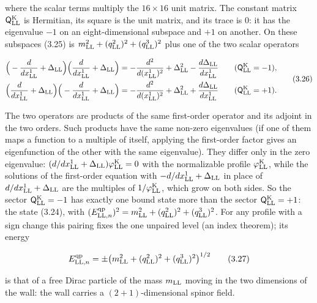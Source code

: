 \documentclass[
  10pt,
]{article}
\begin{document}
where the scalar terms multiply the \(16\times16\) unit matrix. The
constant matrix \(\mathsf Q^{\rm K}_{\rm LL}\) is Hermitian, its square
is the unit matrix, and its trace is 0: it has the eigenvalue \(-1\) on
an eight-dimensional subspace and \(+1\) on another. On these subspaces
(3.25) is \(m_{\rm LL}^2+(q^2_{\rm LL})^2+(q^3_{\rm LL})^2\) plus one of
the two scalar operators

\[\begin{aligned}\Big(-\frac{d}{dx^1_{\rm LL}}+\Delta_{\rm LL}\Big)\Big(\frac{d}{dx^1_{\rm LL}}+\Delta_{\rm LL}\Big)&=-\frac{d^2}{d(x^1_{\rm LL})^2}+\Delta_{\rm LL}^2-\frac{d\Delta_{\rm LL}}{dx^1_{\rm LL}}\qquad(\mathsf Q^{\rm K}_{\rm LL}=-1),\\\Big(\frac{d}{dx^1_{\rm LL}}+\Delta_{\rm LL}\Big)\Big(-\frac{d}{dx^1_{\rm LL}}+\Delta_{\rm LL}\Big)&=-\frac{d^2}{d(x^1_{\rm LL})^2}+\Delta_{\rm LL}^2+\frac{d\Delta_{\rm LL}}{dx^1_{\rm LL}}\qquad(\mathsf Q^{\rm K}_{\rm LL}=+1).\end{aligned}\tag{3.26}\]

The two operators are products of the same first-order operator and its
adjoint in the two orders. Such products have the same non-zero
eigenvalues (if one of them maps a function to a multiple of itself,
applying the first-order factor gives an eigenfunction of the other with
the same eigenvalue). They differ only in the zero eigenvalue:
\((d/dx^1_{\rm LL}+\Delta_{\rm LL})\varphi^{\rm K}_{\rm LL}=0\) with the
normalizable profile \(\varphi^{\rm K}_{\rm LL}\), while the solutions
of the first-order equation with \(-d/dx^1_{\rm LL}+\Delta_{\rm LL}\) in
place of \(d/dx^1_{\rm LL}+\Delta_{\rm LL}\) are the multiples of
\(1/\varphi^{\rm K}_{\rm LL}\), which grow on both sides. So the sector
\(\mathsf Q^{\rm K}_{\rm LL}=-1\) has exactly one bound state more than
the sector \(\mathsf Q^{\rm K}_{\rm LL}=+1\): the state (3.24), with
\((E^{\rm qp}_{{\rm LL},n})^2=m_{\rm LL}^2+(q^2_{\rm LL})^2+(q^3_{\rm LL})^2\).
For any profile with a sign change this pairing fixes the one unpaired
level (an index theorem); its energy

\[E^{\rm qp}_{{\rm LL},n}=\pm\big(m_{\rm LL}^2+(q^2_{\rm LL})^2+(q^3_{\rm LL})^2\big)^{1/2}\tag{3.27}\]

is that of a free Dirac particle of the mass \(m_{\rm LL}\) moving in
the two dimensions of the wall: the wall carries a \((2+1)\)-dimensional
spinor field.
\end{document}
